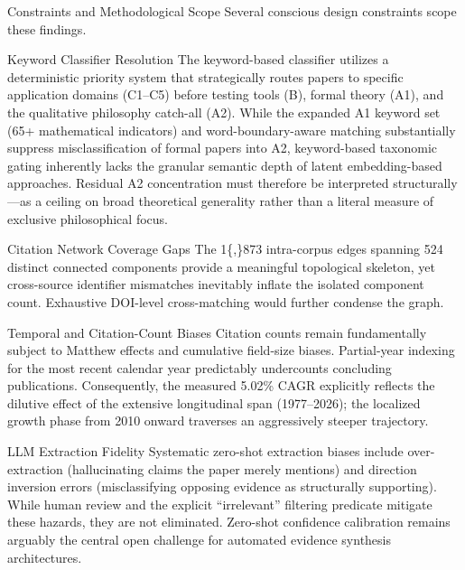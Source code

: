 \documentclass[
  ignorenonframetext,
]{beamer}
\begin{document}
\begin{frame}{Constraints and Methodological Scope}
\protect{}\label{constraints-and-methodological-scope}
Several conscious design constraints scope these findings.

\begin{block}{Keyword Classifier Resolution}
\protect{}\label{keyword-classifier-resolution}
The keyword-based classifier utilizes a deterministic priority system
that strategically routes papers to specific application domains
(C1--C5) before testing tools (B), formal theory (A1), and the
qualitative philosophy catch-all (A2). While the expanded A1 keyword set
(65+ mathematical indicators) and word-boundary-aware matching
substantially suppress misclassification of formal papers into A2,
keyword-based taxonomic gating inherently lacks the granular semantic
depth of latent embedding-based approaches. Residual A2 concentration
must therefore be interpreted structurally---as a ceiling on broad
theoretical generality rather than a literal measure of exclusive
philosophical focus.
\end{block}

\begin{block}{Citation Network Coverage Gaps}
\protect{}\label{citation-network-coverage-gaps}
The 1\{,\}873 intra-corpus edges spanning 524 distinct connected
components provide a meaningful topological skeleton, yet cross-source
identifier mismatches inevitably inflate the isolated component count.
Exhaustive DOI-level cross-matching would further condense the graph.
\end{block}

\begin{block}{Temporal and Citation-Count Biases}
\protect{}\label{temporal-and-citation-count-biases}
Citation counts remain fundamentally subject to Matthew effects and
cumulative field-size biases. Partial-year indexing for the most recent
calendar year predictably undercounts concluding publications.
Consequently, the measured 5.02\% CAGR explicitly reflects the dilutive
effect of the extensive longitudinal span (1977--2026); the localized
growth phase from 2010 onward traverses an aggressively steeper
trajectory.
\end{block}

\begin{block}{LLM Extraction Fidelity}
\protect{}\label{llm-extraction-fidelity}
Systematic zero-shot extraction biases include over-extraction
(hallucinating claims the paper merely mentions) and direction inversion
errors (misclassifying opposing evidence as structurally supporting).
While human review and the explicit ``irrelevant'' filtering predicate
mitigate these hazards, they are not eliminated. Zero-shot confidence
calibration remains arguably the central open challenge for automated
evidence synthesis architectures.
\end{block}
\end{frame}
\end{document}
